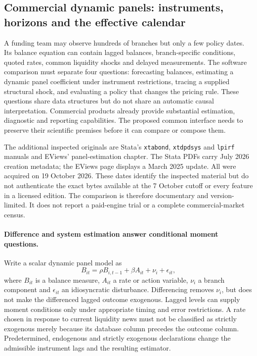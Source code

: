 \subsection{Commercial dynamic panels: instruments, horizons and the effective calendar}
\label{exec19:dynamic-scope}

A funding team may observe hundreds of branches but only a few policy dates.
Its balance equation can contain lagged balances, branch-specific conditions,
quoted rates, common liquidity shocks and delayed measurements. The software
comparison must separate four questions: forecasting balances, estimating a
dynamic panel coefficient under instrument restrictions, tracing a supplied
structural shock, and evaluating a policy that changes the pricing rule.
These questions share data structures but do not share an automatic causal
interpretation. Commercial products already provide substantial estimation,
diagnostic and reporting capabilities. The proposed common interface needs
to preserve their scientific premises before it can compare or compose them.

The additional inspected originals are Stata's \texttt{xtabond},
\texttt{xtdpdsys} and \texttt{lpirf} manuals and EViews' panel-estimation
chapter. The Stata PDFs carry July 2026 creation metadata; the EViews page
displays a March 2025 update. All were acquired on 19 October 2026. These
dates identify the inspected material but do not authenticate the exact bytes
available at the 7 October cutoff or every feature in a licensed edition.
The comparison is therefore documentary and version-limited. It does not
report a paid-engine trial or a complete commercial-market census.
\citep{exec19_dynamic_stata_ab,exec19_dynamic_stata_system,
exec19_dynamic_stata_lp,exec19_dynamic_eviews_panel}

\paragraph{Difference and system estimation answer conditional moment questions.}
Write a scalar dynamic panel model as
\begin{equation}
 B_{it}=\rho B_{i,t-1}+\beta A_{it}+\nu_i+\epsilon_{it},
 \label{exec19:dynamic-model}
\end{equation}
where $B_{it}$ is a balance measure, $A_{it}$ a rate or action variable,
$\nu_i$ a branch component and $\epsilon_{it}$ an idiosyncratic disturbance.
Differencing removes $\nu_i$, but does not make the differenced lagged
outcome exogenous. Lagged levels can supply moment conditions only under
appropriate timing and error restrictions. A rate chosen in response to
current liquidity news must not be classified as strictly exogenous merely
because its database column precedes the outcome column. Predetermined,
endogenous and strictly exogenous declarations change the admissible
instrument lags and the resulting estimator.

